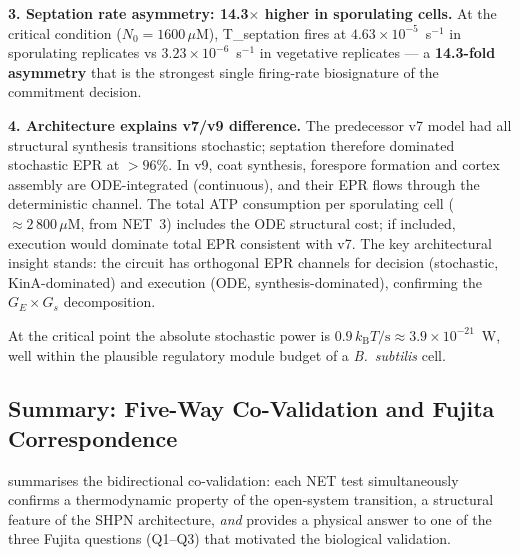 \documentclass[11pt,a4paper]{article}
\newcommand{\kB}{k_{\mathrm{B}}}
\newcommand{\Gs}{G_s}
\newcommand{\Ge}{G_E}
\begin{document}
\textbf{3. Septation rate asymmetry: 14.3$\times$ higher in sporulating cells.}
At the critical condition ($N_0 = 1600\,\mu$M), T\_septation fires at
$4.63\times10^{-5}$~s$^{-1}$ in sporulating replicates vs
$3.23\times10^{-6}$~s$^{-1}$ in vegetative replicates --- a
\textbf{14.3-fold asymmetry} that is the strongest single firing-rate
biosignature of the commitment decision.

\textbf{4. Architecture explains v7/v9 difference.}
The predecessor v7 model had all structural synthesis transitions
stochastic; septation therefore dominated stochastic EPR at $>96\%$.
In v9, coat synthesis, forespore formation and cortex assembly are
ODE-integrated (continuous), and their EPR flows through the
deterministic channel.  The total ATP consumption per sporulating cell
($\approx 2\,800\,\mu$M, from NET~3) includes the ODE structural cost;
if included, execution would dominate total EPR consistent with v7.
The key architectural insight stands: the circuit has orthogonal EPR
channels for decision (stochastic, KinA-dominated) and execution (ODE,
synthesis-dominated), confirming the $\Ge \times \Gs$ decomposition.

At the critical point the absolute stochastic power is
$0.9\,\kB T/\mathrm{s} \approx 3.9\times10^{-21}$~W, well within the
plausible regulatory module budget of a \textit{B.~subtilis} cell.



\subsection{Summary: Five-Way Co-Validation and Fujita Correspondence}
\label{ssec:covalidation}

 summarises the bidirectional co-validation:
each NET test simultaneously confirms a thermodynamic property of the
open-system transition, a structural feature of the SHPN architecture,
\emph{and} provides a physical answer to one of the three Fujita
questions (Q1--Q3) that motivated the biological validation.
\end{document}
